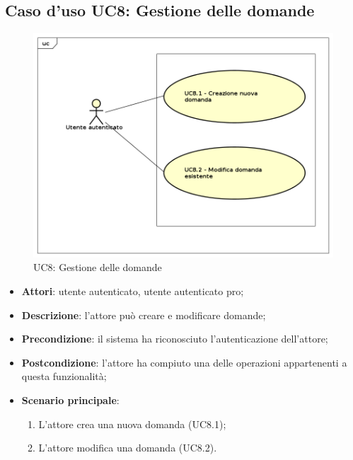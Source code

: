 \newpage
\subsection{Caso d'uso UC8: Gestione delle domande}
	\label{UC8}
	\begin{figure}[h]
		\centering
			\includegraphics[scale=0.45,keepaspectratio]{UML/UC8.png}
		\caption{UC8: Gestione delle domande}
	\end{figure}
	\FloatBarrier
	\begin{itemize}
		\item
			\textbf{Attori}: utente autenticato, utente autenticato pro;
		\item		
			\textbf{Descrizione}: l'attore può creare e modificare domande;
		\item
			\textbf{Precondizione}: il sistema ha riconosciuto l'autenticazione dell'attore; 
		\item
			\textbf{Postcondizione}: l'attore ha compiuto una delle operazioni appartenenti a questa funzionalità;
		\item
			\textbf{Scenario principale}:
	       		\begin{enumerate}
					\item
					L'attore crea una nuova domanda (UC8.1);
					\item
					L'attore modifica una domanda (UC8.2).
	 			\end{enumerate}
	\end{itemize}
